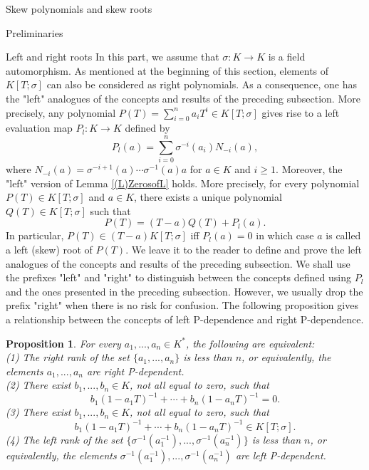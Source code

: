 \documentclass[11pt,a4paper]{article}
\theoremstyle{theorem}
\newtheorem{proposition}[theorem]{Proposition}
\numberwithin{equation}{section}
\newcommand{\s}{\sigma}
\begin{document}
\begin{section}{Skew polynomials and skew roots}
\begin{subsection}{Preliminaries}
	\end{subsection}
\begin{subsection}{Left and right roots}	
	In this part, we assume that $\s:K\to K$ is a  field automorphism. As mentioned at the beginning of this section, elements of $K[T;\s]$ can also be considered as right polynomials. As a consequence, one has the "left" analogues of the concepts and results of the preceding subsection.  More precisely, any polynomial $P(T)=\sum_{i=0}^{n}a_iT^i\in K[T;\s]$ gives rise to a left evaluation map $P_l:K\to K$ defined by
	$$P_l(a)=\sum_{i=0}^{n}\s^{-i}(a_i)N_{-i}(a),$$
	where $N_{-i}(a)=\s^{-i+1}(a)\cdots \s^{-1}(a)a$ for $a\in K$ and $i\geq 1$. 
	Moreover, the "left" version of Lemma \ref{(L)ZerosofL} holds. More precisely,  for every polynomial $P(T)\in K[T;\s]$
	and $a\in K$, there exists a unique polynomial $Q(T)\in K[T;\s]$ such that
	$$P(T)=(T-a)Q(T)+P_l(a).$$
	In particular, $P(T)\in (T-a)K[T;\s]$ iff $P_l(a)=0$ in which case $a$ is called a left (skew) root of $P(T)$. We leave it to the reader to define and prove the left analogues of the concepts and results of the preceding subsection.  We shall use the  prefixes "left" and "right" to distinguish between the concepts defined using $P_l$  and the ones presented in the preceding subsection. However, we usually drop the prefix "right" when there is no risk for confusion. The following proposition gives a relationship between the concepts of left P-dependence and right P-dependence.  

	\begin{proposition}\label{(P)FormulationofVandermonde}
		For every $a_1,...,a_n\in K^*$, the following are equivalent:\\
		(1) The right rank of the set $\{a_1,...,a_n\}$  is less than $n$, or equivalently, the elements $a_1,...,a_n$ are right P-dependent.\\
		(2) There exist $b_1,...,b_n\in K$, not all equal to zero, such that  $$b_1(1-a_1T)^{-1}+\cdots+b_n(1-a_nT)^{-1}=0.$$ 
		(3) There exist $b_1,...,b_n\in K$, not all equal to zero, such that  $$b_1(1-a_1T)^{-1}+\cdots+b_n(1-a_nT)^{-1}\in K[T;\s].$$ 
		(4) 	The left rank of the set $\{\s^{-1}(a_1^{-1}),...,\s^{-1}(a_n^{-1})\}$ is less than $n$, or equivalently, the elements $\s^{-1}(a_1^{-1}),...,\s^{-1}(a_n^{-1})$ are left P-dependent. 	
		

\end{proposition}
\end{subsection}
\end{section}
\end{document}
